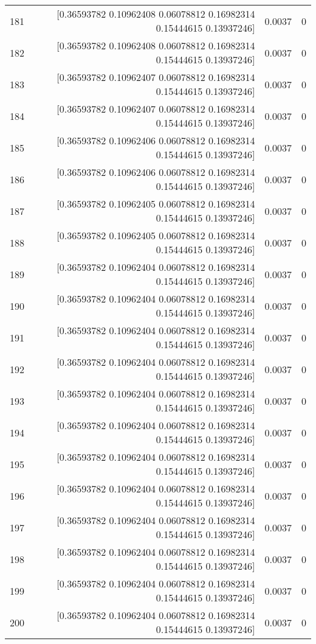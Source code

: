 \begin{longtable}{lrrr}
181 & [0.36593782 0.10962408 0.06078812 0.16982314 0.15444615 0.13937246] & 0.0037 & 0 \\
182 & [0.36593782 0.10962408 0.06078812 0.16982314 0.15444615 0.13937246] & 0.0037 & 0 \\
183 & [0.36593782 0.10962407 0.06078812 0.16982314 0.15444615 0.13937246] & 0.0037 & 0 \\
184 & [0.36593782 0.10962407 0.06078812 0.16982314 0.15444615 0.13937246] & 0.0037 & 0 \\
185 & [0.36593782 0.10962406 0.06078812 0.16982314 0.15444615 0.13937246] & 0.0037 & 0 \\
186 & [0.36593782 0.10962406 0.06078812 0.16982314 0.15444615 0.13937246] & 0.0037 & 0 \\
187 & [0.36593782 0.10962405 0.06078812 0.16982314 0.15444615 0.13937246] & 0.0037 & 0 \\
188 & [0.36593782 0.10962405 0.06078812 0.16982314 0.15444615 0.13937246] & 0.0037 & 0 \\
189 & [0.36593782 0.10962404 0.06078812 0.16982314 0.15444615 0.13937246] & 0.0037 & 0 \\
190 & [0.36593782 0.10962404 0.06078812 0.16982314 0.15444615 0.13937246] & 0.0037 & 0 \\
191 & [0.36593782 0.10962404 0.06078812 0.16982314 0.15444615 0.13937246] & 0.0037 & 0 \\
192 & [0.36593782 0.10962404 0.06078812 0.16982314 0.15444615 0.13937246] & 0.0037 & 0 \\
193 & [0.36593782 0.10962404 0.06078812 0.16982314 0.15444615 0.13937246] & 0.0037 & 0 \\
194 & [0.36593782 0.10962404 0.06078812 0.16982314 0.15444615 0.13937246] & 0.0037 & 0 \\
195 & [0.36593782 0.10962404 0.06078812 0.16982314 0.15444615 0.13937246] & 0.0037 & 0 \\
196 & [0.36593782 0.10962404 0.06078812 0.16982314 0.15444615 0.13937246] & 0.0037 & 0 \\
197 & [0.36593782 0.10962404 0.06078812 0.16982314 0.15444615 0.13937246] & 0.0037 & 0 \\
198 & [0.36593782 0.10962404 0.06078812 0.16982314 0.15444615 0.13937246] & 0.0037 & 0 \\
199 & [0.36593782 0.10962404 0.06078812 0.16982314 0.15444615 0.13937246] & 0.0037 & 0 \\
200 & [0.36593782 0.10962404 0.06078812 0.16982314 0.15444615 0.13937246] & 0.0037 & 0 \\

\end{longtable}
